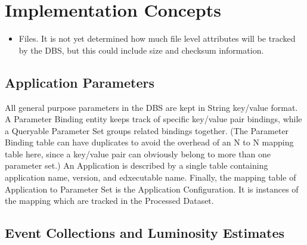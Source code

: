 \section{Implementation Concepts}

\begin{itemize}
\item Files. It is not yet determined how much file level attributes will be 
tracked by the DBS, but this could include size and checksum information.
\end{itemize}

\subsection{Application Parameters}

All general purpose parameters in the DBS are kept in String key/value 
format.  A Parameter Binding entity keeps track of specific key/value pair 
bindings, while a Queryable Parameter Set groups related bindings together. 
(The Parameter Binding table can have duplicates to avoid the overhead of 
an N to N mapping table here, since a key/value pair can obviously belong to 
more than one parameter set.) An Application is described by a single table 
containing application name, version, and edxecutable name.  Finally, the 
mapping table of Application to Parameter Set is the Application 
Configuration.  It is instances of the mapping which are tracked in the 
Processed Dataset.


\subsection{ Event Collections and Luminosity Estimates}

